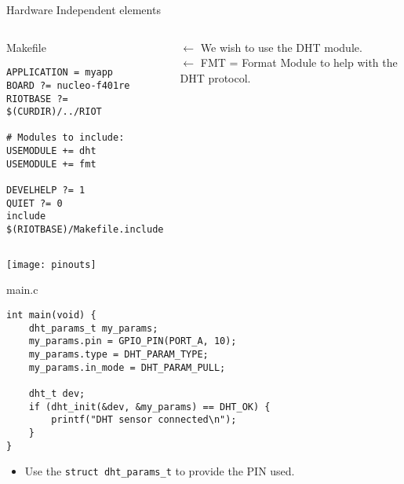 \documentclass[aspectratio=169]{beamer}
\begin{document}
\begin{frame}[fragile]{Hardware Independent elements}
\vspace{-.5cm}
\begin{columns}

\begin{exampleblock}{Makefile}
\begin{verbatim}
APPLICATION = myapp
BOARD ?= nucleo-f401re
RIOTBASE ?= $(CURDIR)/../RIOT

# Modules to include:
USEMODULE += dht
USEMODULE += fmt	

DEVELHELP ?= 1
QUIET ?= 0
include $(RIOTBASE)/Makefile.include
\end{verbatim}
\end{exampleblock}


\vspace{1.45cm}

$\leftarrow$ We wish to use the \alert{DHT module}.\\
$\leftarrow$ \alert{FMT} = Format Module to help with the DHT protocol.

\end{columns}
\vspace{.5cm}
\end{frame}



\begin{frame}{}
\vspace{.2cm}
\hspace*{1cm}
\texttt{[image: pinouts]}
\end{frame}


\begin{frame}[fragile]{}

\begin{exampleblock}{main.c}
\begin{verbatim}
int main(void) {
    dht_params_t my_params;
    my_params.pin = GPIO_PIN(PORT_A, 10);
    my_params.type = DHT_PARAM_TYPE;
    my_params.in_mode = DHT_PARAM_PULL;

    dht_t dev;
    if (dht_init(&dev, &my_params) == DHT_OK) {
        printf("DHT sensor connected\n");
    }
}
\end{verbatim}
\end{exampleblock}

\begin{itemize}

\item Use the \texttt{struct dht_params_t} to provide the PIN used.

\end{itemize}

\vspace{5cm}
\end{frame}
\end{document}
